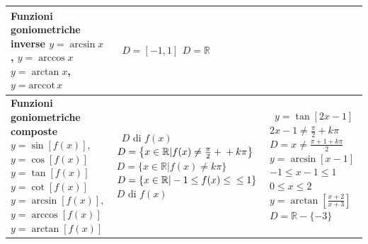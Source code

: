\begin{table}   

\raggedleft   
\begin{tabularx}{1,2\textwidth}{XXX}
  \midrule

  \textbf{Funzioni goniometriche inverse} \newline 
$y=\arcsin{x}$, $y=\arccos{x}$ \newline \newline $y=\arctan x$, 
$y=\text{arccot}\,x$
  & $\,$ \newline \newline $D=[-1,1]$ \newline  \newline 
$D=\mathbb{R}$
  &  \\
  \midrule

  \textbf{Funzioni goniometriche composte} \newline 
$y=\sin[f(x)]$, $y=\cos [f(x)]$ \newline \newline $y=\tan [f(x)]$ \newline 
\newline \newline $y=\cot [f(x)]$ \newline  \newline $y=\arcsin[f(x)]$, 
\newline $y=\arccos [f(x)]$ \newline \newline $y=\arctan [f(x)]$
  & $\,$ \newline \newline $D$ di $f(x)$ \newline  \newline 
$D=\bigl\{x\in\mathbb{R}\vert f(x)\neq\frac{\pi}{2}+\newline+k\pi 
\bigr\}$\newline \newline $D=\{x\in\mathbb{R}\vert f(x)\neq k\pi\}$ \newline 
\newline $D=\{x\in\mathbb{R}\vert -1\leq f(x)\leq\newline\leq1\}$ \newline 
\newline $D$ di $f(x)$
  & $\,$ \newline \newline \newline $y=\tan[2x-1]$ \newline 
$2x-1\neq \frac{\pi}{2}+k\pi$ \newline$D=x\neq\frac{\pi+1+k\pi}{2}$  \newline 
\newline \newline  $y=\arcsin[x-1]$ \newline $-1\leq x-1\leq1$\newline $0\leq 
x\leq2$\newline \newline$y=\arctan [\frac{x+2}{x+3}]$ \newline 
$D=\mathbb{R}-\{-3\}$
 \\

  \bottomrule
\end{tabularx}
\end{table}
